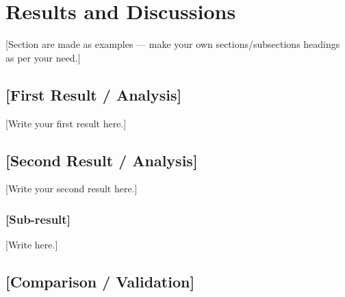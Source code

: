 


\chapter{Results and Discussions}
\label{chap:results}

[Section are made as examples — make your own sections/subsections headings as per your need.]


\section{[First Result / Analysis]}
\label{sec:result1}


[Write your first result here.]

\section{[Second Result / Analysis]}
\label{sec:result2}

[Write your second result here.]

\subsection{[Sub-result]}

[Write here.]

\section{[Comparison / Validation]}
\label{sec:validation}


